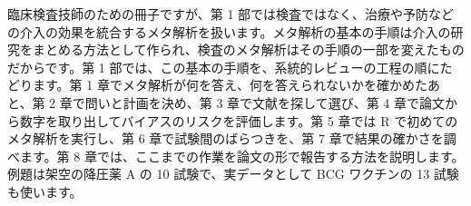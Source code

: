 臨床検査技師のための冊子ですが、第 1 部では検査ではなく、治療や予防などの介入の効果を統合するメタ解析を扱います。メタ解析の基本の手順は介入の研究をまとめる方法として作られ、検査のメタ解析はその手順の一部を変えたものだからです。第 1 部では、この基本の手順を、系統的レビューの工程の順にたどります。第 1 章でメタ解析が何を答え、何を答えられないかを確かめたあと、第 2 章で問いと計画を決め、第 3 章で文献を探して選び、第 4 章で論文から数字を取り出してバイアスのリスクを評価します。第 5 章では R で初めてのメタ解析を実行し、第 6 章で試験間のばらつきを、第 7 章で結果の確かさを調べます。第 8 章では、ここまでの作業を論文の形で報告する方法を説明します。例題は架空の降圧薬 A の 10 試験で、実データとして BCG ワクチンの 13 試験も使います。
